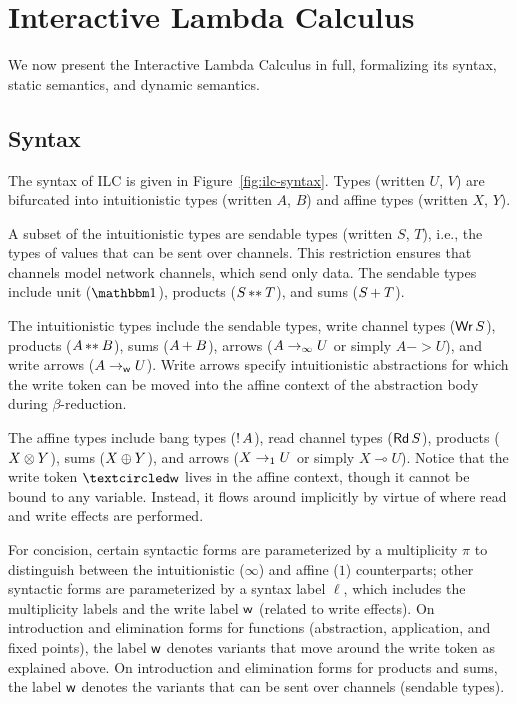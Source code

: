 
%



\section{Interactive Lambda Calculus}
\label{sec:ilc}

We now present the Interactive Lambda Calculus in full, formalizing its syntax,
static semantics, and dynamic semantics.

\subsection{Syntax}
\label{subsec:syntax}

The syntax of ILC is given in Figure~\ref{fig:ilc-syntax}. Types (written $U$,
$V$) are bifurcated into intuitionistic types (written $A$, $B$) and affine
types (written $X$, $Y$).

A subset of the intuitionistic types are sendable types (written $S$, $T$),
i.e., the types of values that can be sent over channels. This restriction
ensures that channels model network channels, which send only data. The sendable
types include unit ($\tyUnit$), products (${S}\, {**}_{}\, {T}$), and sums
(${S}\, {+}_{}\, {T}$).

The intuitionistic types include the sendable types, write channel types
($\textnormal{\textsf{Wr}}\,S$), products (${A}\, {**}_{}\, {B}$), sums (${A}\, {+}_{}\, {B}$), arrows
(${A}\rightarrow_{\infty}{U}$ or simply $A -> U$), and write arrows
(${A}\rightarrow_{\textsf{w}}{U}$). Write arrows specify intuitionistic abstractions for
which the write token can be moved into the affine context of the abstraction
body during $\beta$-reduction.

The affine types include bang types (${!}\,{A}$), read channel types
($\textnormal{\textsf{Rd}}\,S$), products (${X}\otimes{Y}$), sums (${X}\oplus{Y}$), and arrows
(${X}\rightarrow_{1}{U}$ or simply $X \multimap U$). Notice that the write token $\wrtok$
lives in the affine context, though it cannot be bound to any variable. Instead,
it flows around implicitly by virtue of where read and write effects are
performed.

For concision, certain syntactic forms are parameterized by a multiplicity $\pi$
to distinguish between the intuitionistic ($\infty$) and affine ($1$)
counterparts; other syntactic forms are parameterized by a syntax label $\ell$,
which includes the multiplicity labels and the write label $\textsf{w}$ (related to
write effects). On introduction and elimination forms for functions
(abstraction, application, and fixed points), the label $\textsf{w}$ denotes variants
that move around the write token as explained above. On introduction and
elimination forms for products and sums, the label $\textsf{w}$ denotes the variants
that can be sent over channels (sendable types).

